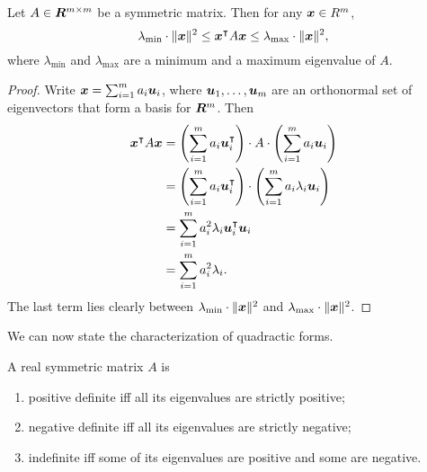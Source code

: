 \begin{lemma}
Let $A \in \bm{R}^{m \times m}$ be a symmetric matrix. Then for any $\boldsymbol{x} \in R^m$,
\[
    \lambda_{\text{min}} \cdot \lVert\boldsymbol{x}\rVert^2 \leq \boldsymbol{x}^{\intercal} A \boldsymbol{x}
    \leq \lambda_{\text{max}} \cdot \lVert\boldsymbol{x}\rVert^2,
\]
where $ \lambda_{\text{min}} $ and $ \lambda_{\text{max}} $ are a minimum
and a maximum eigenvalue of $A$.
\end{lemma}
\begin{proof}
Write $\boldsymbol{x} = \sum_{i = 1}^m a_i \boldsymbol{u}_i$, where $\boldsymbol{u}_1, \ldots, \boldsymbol{u}_m$
are an orthonormal set of eigenvectors that form a basis for $\bm{R}^m$. Then
\begin{align*}
\boldsymbol{x}^{\intercal} A \boldsymbol{x} & =  \left ( \sum_{i = 1}^m a_i \boldsymbol{u}_i^{\intercal} \right )
                                 \cdot A \cdot
                                 \left ( \sum_{i = 1}^m a_i \boldsymbol{u}_i \right ) \\
& =  \left ( \sum_{i = 1}^m a_i \boldsymbol{u}_i^{\intercal} \right ) \cdot
     \left ( \sum_{i = 1}^m a_i \lambda_i \boldsymbol{u}_i \right ) \\
& = \sum_{i = 1}^{m} a_i^2 \lambda_i \boldsymbol{u}_i^{\intercal} \boldsymbol{u}_i \\
& =  \sum_{i = 1}^{m} a_i^2 \lambda_i.
\end{align*}
The last term lies clearly between $ \lambda_{\text{min}} \cdot \lVert\boldsymbol{x}\rVert^2 $
and $\lambda_{\text{max}} \cdot \lVert\boldsymbol{x}\rVert^2$.
\end{proof}

We can now state the characterization of quadractic forms.
\begin{theorem}
A real symmetric matrix $A$ is
\begin{enumerate}
    \item positive definite iff all its eigenvalues are strictly positive;
    \item negative definite iff all its eigenvalues are strictly negative;
    \item indefinite iff some of its eigenvalues are positive and some are negative.
\end{enumerate}
\end{theorem}
